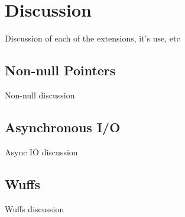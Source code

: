 \documentclass[main.tex]{subfiles}
\begin{document}
\section{Discussion}
Discussion of each of the extensions, it's use, etc
\subsection{Non-null Pointers}
Non-null discussion
\subsection{Asynchronous I/O}
Async IO discussion
\subsection{Wuffs}
Wuffs discussion
\end{document}
